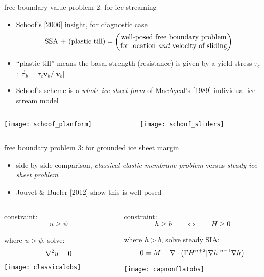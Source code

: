 \begin{frame}{free boundary value problem 2: for ice streaming}

\begin{itemize}
\item  Schoof's [2006] insight, for diagnostic case
  $$\text{SSA + (plastic till)} = \begin{pmatrix}
\text{well-posed free boundary problem} \\ \text{for location \emph{and} velocity of sliding}
\end{pmatrix} $$
\item ``plastic till'' means the basal strength (resistance) is given by a yield stress $\tau_c$:  \qquad $\vec\tau_b = \tau_c \mathbf{v}_b / |\mathbf{v}_b|$
\item Schoof's scheme is a \emph{whole ice sheet form} of MacAyeal's [1989] individual ice stream model
\end{itemize}

\begin{columns}
\begin{column}{0.5\textwidth}
\begin{center}
  \texttt{[image: schoof\_planform]}
\end{center}
\end{column}
\begin{column}{0.5\textwidth}
\begin{center}
  \texttt{[image: schoof\_sliders]}
\end{center}
\end{column}
\end{columns}
\end{frame}


\begin{frame}{free boundary problem 3: for grounded ice sheet margin}

\begin{itemize}
\item side-by-side comparison, \emph{classical elastic membrane problem} versus \emph{steady ice sheet problem}
\item Jouvet \& Bueler [2012] show this is well-posed
\end{itemize}
\small
\begin{columns}[T]
\begin{column}{0.4\textwidth}
constraint:
  $$u \ge \psi$$

where $u>\psi$, solve:
  $$\nabla^2 u = 0$$

\bigskip
\texttt{[image: classicalobs]}
\end{column}
\begin{column}{0.6\textwidth}
constraint:
  $$h \ge b \qquad \iff \qquad H \ge 0$$

where $h>b$, solve steady SIA:
  $$0 = M + \nabla\cdot \left(\Gamma H^{n+2} |\nabla h|^{n-1} \nabla h \right)$$

\bigskip
\texttt{[image: capnonflatobs]}
\end{column}
\end{columns}
\end{frame}


